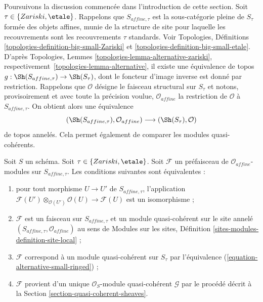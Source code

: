 \noindent
Poursuivons la discussion commencée dans l'introduction de cette section.
Soit $\tau \in \{Zariski, \etale\}$. Rappelons que $S_{affine, \tau}$ est la
sous-catégorie pleine de $S_\tau$ formée des objets affines, munie de la
structure de site pour laquelle les recouvrements sont les recouvrements
$\tau$ standards. Voir Topologies, Définitions
\ref{topologies-definition-big-small-Zariski} et
\ref{topologies-definition-big-small-etale}. D'après Topologies, Lemmes
\ref{topologies-lemma-alternative-zariski}, respectivement\  
\ref{topologies-lemma-alternative}, il existe une équivalence de topos
$g : \Sh(S_{affine, \tau}) \to \Sh(S_\tau)$, dont le foncteur d'image inverse
est donné par restriction. Rappelons que $\mathcal{O}$ désigne le faisceau
structural sur $S_\tau$ et notons, provisoirement et avec toute la précision
voulue, $\mathcal{O}_{affine}$ la restriction de $\mathcal{O}$ à
$S_{affine, \tau}$. On obtient alors une équivalence
\begin{equation}
\label{equation-alternative-small-ringed}
(\Sh(S_{affine, \tau}), \mathcal{O}_{affine})
\longrightarrow
(\Sh(S_\tau), \mathcal{O})
\end{equation}
de topos annelés. Cela permet également de comparer les modules
quasi-cohérents.

\begin{lemma}
\label{lemma-quasi-coherent-alternative-small}
Soit $S$ un schéma. Soit $\tau \in \{Zariski, \etale\}$.
Soit $\mathcal{F}$ un préfaisceau de $\mathcal{O}_{affine}$-modules sur
$S_{affine, \tau}$. Les conditions suivantes sont équivalentes :
\begin{enumerate}
\item pour tout morphisme $U \to U'$ de $S_{affine, \tau}$, l'application
$\mathcal{F}(U') \otimes_{\mathcal{O}(U')} \mathcal{O}(U) \to \mathcal{F}(U)$
est un isomorphisme ;
\item $\mathcal{F}$ est un faisceau sur $S_{affine, \tau}$ et un module
quasi-cohérent sur le site annelé
$(S_{affine, \tau}, \mathcal{O}_{affine})$ au sens de Modules sur les sites,
Définition \ref{sites-modules-definition-site-local} ;
\item $\mathcal{F}$ correspond à un module quasi-cohérent sur $S_\tau$ par
l'équivalence (\ref{equation-alternative-small-ringed}) ;
\item $\mathcal{F}$ provient d'un unique $\mathcal{O}_S$-module
quasi-cohérent $\mathcal{G}$ par le procédé décrit à la Section
\ref{section-quasi-coherent-sheaves}.
\end{enumerate}
\end{lemma}

